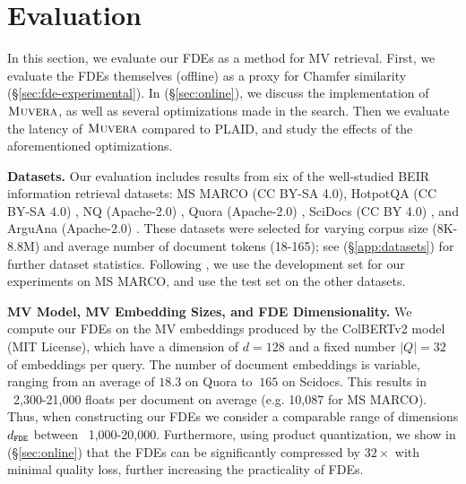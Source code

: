 
\section{Evaluation} \label{sec:eval}
In this section, we evaluate our FDEs as a method for MV retrieval. First, we evaluate the FDEs themselves (offline) as a proxy for Chamfer similarity (§\ref{sec:fde-experimental}). In (§\ref{sec:online}), we discuss the implementation of $\textsc{Muvera}$, as well as several optimizations made in the search. Then we evaluate the latency of $\textsc{Muvera}$ compared to PLAID, and study the effects of the aforementioned optimizations.



\textbf{Datasets.} Our evaluation includes results from six of the well-studied BEIR \cite{thakur2021beir} information retrieval datasets: MS MARCO \cite{nguyen2016ms} (CC BY-SA 4.0), HotpotQA (CC BY-SA 4.0) \cite{yang2018hotpotqa}, NQ (Apache-2.0) \cite{kwiatkowski2019natural}, Quora (Apache-2.0) \cite{thakur2021beir}, SciDocs (CC BY 4.0) \cite{cohan2020specter}, and ArguAna (Apache-2.0) \cite{wachsmuth2018retrieval}. These datasets were selected for varying corpus size (8K-8.8M) and average number of document tokens (18-165); see (§\ref{app:datasets}) for further dataset statistics. Following \cite{santhanam2022plaid}, we use the development set for our experiments on MS MARCO, and use the test set on the other datasets.  


\textbf{MV Model, MV Embedding Sizes, and FDE Dimensionality.}
We compute our FDEs on the MV embeddings produced by the ColBERTv2 model \cite{santhanam2021colbertv2} (MIT License), which have a dimension of $d= 128$ and a fixed number $|Q|=32$ of embeddings per query. The number of document embeddings is variable, ranging from an average of $18.3$ on Quora to $~165$ on Scidocs. This results in ~2,300-21,000 floats per document on average (e.g. 10,087 for MS MARCO). Thus, when constructing our FDEs we consider a comparable range of dimensions $d_{\texttt{FDE}}$ between ~1,000-20,000. Furthermore,  using product quantization, we show in (§\ref{sec:online}) that the FDEs can be significantly compressed by $32\times$ with minimal quality loss, further increasing the practicality of FDEs.  


